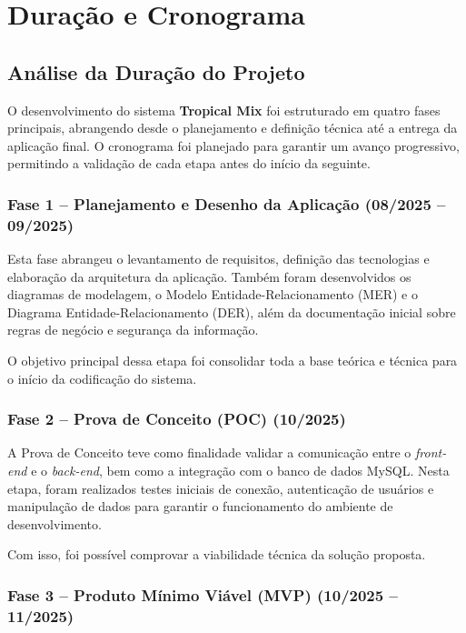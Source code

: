 \newpage
\section{Duração e Cronograma}

\subsection{Análise da Duração do Projeto}

O desenvolvimento do sistema \textbf{Tropical Mix} foi estruturado em quatro fases principais, abrangendo desde o planejamento e definição técnica até a entrega da aplicação final. O cronograma foi planejado para garantir um avanço progressivo, permitindo a validação de cada etapa antes do início da seguinte.  

\subsubsection{Fase 1 – Planejamento e Desenho da Aplicação (08/2025 – 09/2025)}

Esta fase abrangeu o levantamento de requisitos, definição das tecnologias e elaboração da arquitetura da aplicação. Também foram desenvolvidos os diagramas de modelagem, o Modelo Entidade-Relacionamento (MER) e o Diagrama Entidade-Relacionamento (DER), além da documentação inicial sobre regras de negócio e segurança da informação.  

O objetivo principal dessa etapa foi consolidar toda a base teórica e técnica para o início da codificação do sistema.

\subsubsection{Fase 2 – Prova de Conceito (POC) (10/2025)}

A Prova de Conceito teve como finalidade validar a comunicação entre o \textit{front-end} e o \textit{back-end}, bem como a integração com o banco de dados MySQL. Nesta etapa, foram realizados testes iniciais de conexão, autenticação de usuários e manipulação de dados para garantir o funcionamento do ambiente de desenvolvimento.  

Com isso, foi possível comprovar a viabilidade técnica da solução proposta.

\subsubsection{Fase 3 – Produto Mínimo Viável (MVP) (10/2025 – 11/2025)}

